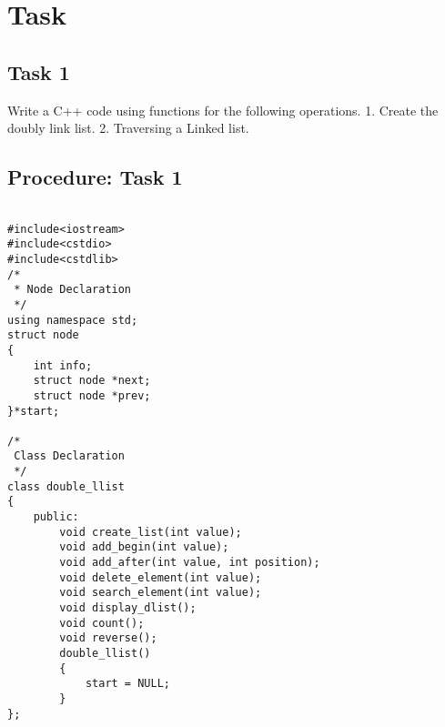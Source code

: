 \documentclass[11pt]{article}            %
\begin{document}
\section{Task}  
\subsection{ Task 1 }     


Write a C++ code using functions for the following operations. 
1.
Create the doubly link list.
2. 
Traversing a Linked list.
 

\subsection{Procedure: Task 1 }    

\begin{lstlisting}

#include<iostream>
#include<cstdio>
#include<cstdlib>
/*
 * Node Declaration
 */
using namespace std;
struct node
{
    int info;
    struct node *next;
    struct node *prev;
}*start;
 
/*
 Class Declaration 
 */
class double_llist
{
    public:
        void create_list(int value);
        void add_begin(int value);
        void add_after(int value, int position);
        void delete_element(int value);
        void search_element(int value);
        void display_dlist();
        void count();
        void reverse();
        double_llist()
        {
            start = NULL;  
        }
};
 

\end{lstlisting}
\end{document}
